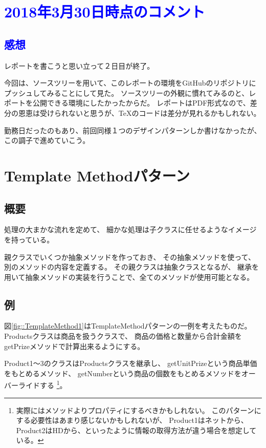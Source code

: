 \documentclass[11pt]{jsarticle}
\begin{document}
	\section*{\textcolor{blue}{2018年3月30日時点のコメント}}
		\subsection*{\textcolor{blue}{感想}}
			レポートを書こうと思い立って２日目が終了。
			
			今回は、ソースツリーを用いて、このレポートの環境をGitHubのリポジトリにプッシュしてみることにして見た。
			ソースツリーの外観に慣れてみるのと、レポートを公開できる環境にしたかったからだ。
			レポートはPDF形式なので、差分の恩恵は受けられないと思うが、\TeX のコードは差分が見れるかもしれない。
			
			勤務日だったのもあり、前回同様１つのデザインパターンしか書けなかったが、この調子で進めていこう。
			\clearpage
			
	\section{Template Methodパターン}
		\subsection{概要}
			処理の大まかな流れを定めて、
			細かな処理は子クラスに任せるようなイメージを持っている。
			
			親クラスでいくつか抽象メソッドを作っておき、
			その抽象メソッドを使って、別のメソッドの内容を定義する。
			その親クラスは抽象クラスとなるが、
			継承を用いて抽象メソッドの実装を行うことで、全てのメソッドが使用可能となる。
			
		\subsection{例}
			図\ref{fig::TemplateMethod1}はTemplateMethodパターンの一例を考えたものだ。
			Productsクラスは商品を扱うクラスで、
			商品の価格と数量から合計金額をgetPrizeメソッドで計算出来るようにする。
			
			Product1〜3のクラスはProductsクラスを継承し、
			getUnitPrizeという商品単価をもとめるメソッド、
			getNumberという商品の個数をもとめるメソッドをオーバーライドする
			\footnote{実際にはメソッドよりプロパティにするべきかもしれない。
			このパターンにする必要性はあまり感じないかもしれないが、
			Product1はネットから、Product2はHDから、といったように情報の取得方法が違う場合を想定している。}。
			
\end{document}
